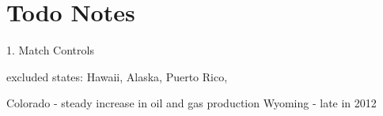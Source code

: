 \section{Todo Notes}

1. Match Controls

excluded states: Hawaii, Alaska, Puerto Rico, 

Colorado - steady increase in oil and gas production
Wyoming - late in 2012